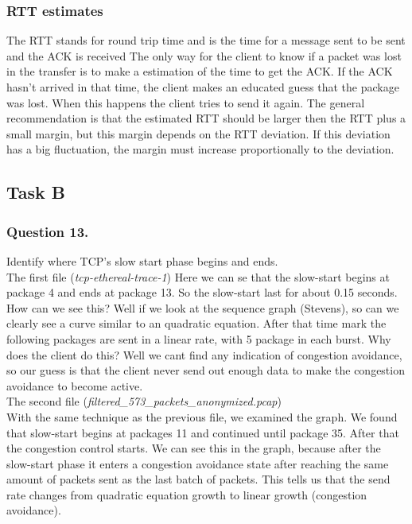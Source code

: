 \documentclass{mall}
\begin{document}
\subsubsection{RTT estimates}
The RTT stands for round trip time and is the time for a message sent to be sent and the ACK is received The only way for the client to know if a packet was lost in the transfer is to make a estimation of the time to get the ACK. If the ACK hasn't arrived in that time, the client makes an educated guess that the package was lost. When this happens the client tries to send it again. The general recommendation is that the estimated RTT should be larger then the RTT plus a small margin, but this margin depends on the RTT deviation. If this deviation has a big fluctuation, the margin must increase proportionally to the deviation.
\pagebreak
\subsection{Task B}
\subsubsection{Question 13.}
Identify where TCP's slow start phase begins and ends.\\

The first file (\textit{tcp-ethereal-trace-1})
Here we can se that the slow-start begins at package 4 and ends at package 13. So the slow-start last for about 0.15 seconds. How can we see this? Well if we look at the sequence graph (Stevens), so can we clearly see a curve similar to an quadratic equation. After that time mark the following packages are sent in a linear rate, with 5 package in each burst. Why does the client do this? Well we cant find any indication of congestion avoidance, so our guess is that the client never send out enough data to make the congestion avoidance to become active.\\

The second file (\textit{filtered\_573\_packets\_anonymized.pcap})\\

With the same technique as the previous file, we examined the graph. We found that slow-start begins at packages 11 and continued until package 35. After that the congestion control starts. We can see this in the graph, because after the slow-start phase it enters a congestion avoidance state after reaching the same amount of packets sent as the last batch of packets. This tells us that the send rate changes from quadratic equation growth to linear growth (congestion avoidance).
\end{document}
